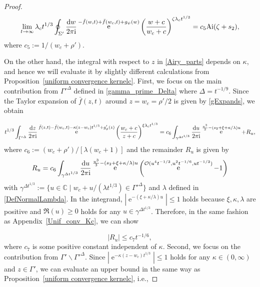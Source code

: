\documentclass[cmp]{svjour}
\numberwithin{theorem}{section}
\numberwithin{equation}{section}
\DeclareMathOperator{\e}{e}
\def\dd{{\rm d}}
\def\ii{{\rm i}}
\begin{document}
\begin{proof}
\begin{equation}
\label{Airy_parts_w_limit}
\lim_{t \to \infty} \lambda_c t^{1/3} \oint_{\Sigma'} \frac{\dd w}{2 \pi \ii} \e^{-\bar{f}(w,t) + \bar{f}(w_c,t) + g_{\psi}(w)} {\left( \frac{w+c}{w_c + c} \right)}^{\zeta \lambda_c t^{1/3}} = c_5 \mathrm{Ai}(\zeta + s_2),
\end{equation}
where $c_5 := 1/(w_c + \rho')$.

On the other hand, the integral with respect to $z$ in \eqref{Airy_parts} depends on $\kappa$, and hence we will evaluate it by slightly different calculations from Proposition~\ref{uniform convergence kernelc}.
First, we focus on the main contribution from ${\Gamma'}^\Delta$ defined in \eqref{gamma_prime_Delta} where $\Delta = t^{-1/9}$.
Since the Taylor expansion of $\bar{f}(z,t)$ around $z = w_c = \rho'/2$ is given by \eqref{gExpands}, we obtain

\begin{multline*}
\label{Airy_parts_z}
t^{1/3} \int_{{\Gamma'}^\Delta} \frac{\dd z}{2 \pi \ii} \e^{\bar{f}(z,t)-\bar{f}(w_c,t) - \kappa (z - w_c) t^{1/3} + g'_{\phi}(z)}  {\left( \frac{w_c + c}{z + c} \right)}^{\xi \lambda_c t^{1/3}}  =  c_6 \int_{\gamma^{\Delta t^{1/3}}} \frac{\dd u}{2 \pi \ii} \e^{ \frac{u^3}{3} - (s_2 + \xi + \kappa / \lambda) u } + R_u,
\end{multline*}
where $c_6 := (w_c + \rho')/[\lambda (w_c + 1)]$ and the remainder $R_u$ is given by
\begin{equation*}
R_u = c_6 \int_{\gamma^{\Delta t^{1/3}}} \frac{\dd u}{2 \pi \ii} \e^{ \frac{u^3}{3} - (s_2 + \xi + \kappa / \lambda) u } \left( \e^{\mathcal{O}(u^4 t^{-1/3}, u^2 t^{-1/6}, u t^{-1/3})} - 1 \right)
\end{equation*}
with  $\gamma^{\Delta t^{1/3}} := \{ u \in \mathbb{C} \mid w_c + u /( \lambda t^{1/3} ) \in {\Gamma'}^{\Delta} \}$ and $\lambda$ defined in \eqref{DefNormalLambda}.
In the integrand, $ \left| \e^{- (\xi + \kappa / \lambda) u } \right| \leq 1 $ holds because $\xi, \kappa, \lambda$ are positive and $\Re(u) \geq 0$ holds for any $u \in \gamma^{\Delta t^{1/3}}$.
Therefore, in the same fashion as Appendix~\ref{Unif_conv_Kc}, we can show

\begin{equation*}
|R_u| \leq c_7 t^{-1/6},
\end{equation*}
where $c_7$ is some positive constant independent of $\kappa$.
Second, we focus on the contribution from $\Gamma' \backslash {\Gamma'}^\Delta$.
Since $|\e^{- \kappa (z - w_c) t^{1/3}}| \leq 1$ holds for any $\kappa \in (0, \infty)$ and $z \in \Gamma'$, we can evaluate an upper bound in the same way as Proposition~\ref{uniform convergence kernelc}, i.e.,




\end{proof}
\end{document}

